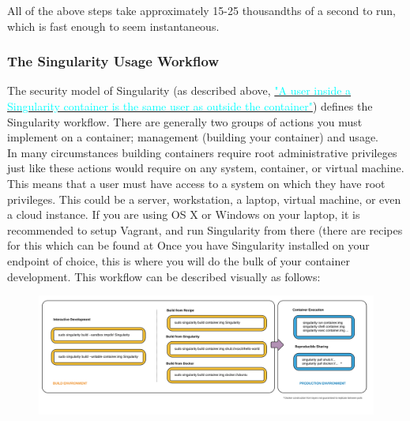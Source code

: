 \documentclass[a4paper]{article}
\begin{document}
All of the above steps take approximately 15-25 thousandths of a second to run, which is fast enough to seem instantaneous.
\subsubsection{The Singularity Usage Workflow}

The security model of Singularity (as described above, \hyperref[sec:securityandpriviledge]{{\textcolor{cyan}{"A user inside a Singularity container is the same user as outside the container"}}}) defines the Singularity workflow. There are generally two groups of actions you must implement on a container; management (building your container) and usage.\\[0.1in]

In many circumstances building containers require root administrative privileges just like these actions would require on any system, container, or virtual machine. This means that a user must have access to a system on which they have root privileges. This could be a server, workstation, a laptop, virtual machine, or even a cloud instance. If you are using OS X or Windows on your laptop, it is recommended to setup Vagrant, and run Singularity from there (there are recipes for this which can be found at  Once you have Singularity installed on your endpoint of choice, this is where you will do the bulk of your container development.
This workflow can be described visually as follows:
\\[0.1in]
\begin{figure}[h]
\centering
\hspace*{-0.62in}
{\includegraphics[scale=0.168]{assets/img/flow.png}}
\end{figure}
\end{document}
